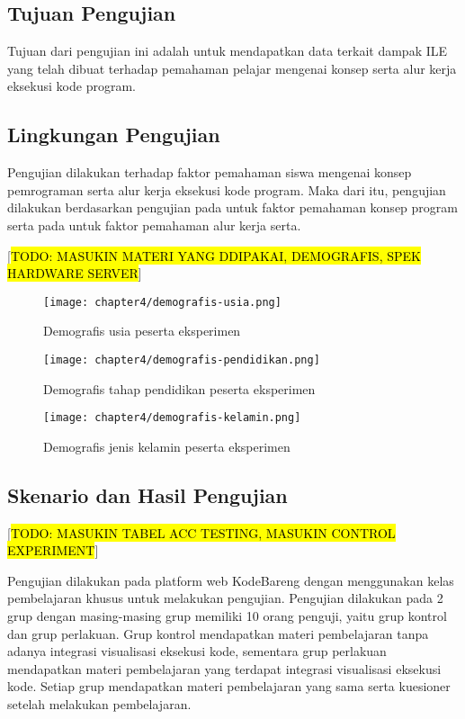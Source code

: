 \subsection{Tujuan Pengujian}
Tujuan dari pengujian ini adalah untuk mendapatkan data terkait dampak ILE yang telah dibuat terhadap pemahaman pelajar mengenai konsep serta alur kerja eksekusi kode program.

\subsection{Lingkungan Pengujian}
Pengujian  dilakukan terhadap faktor pemahaman siswa mengenai konsep pemrograman serta alur kerja eksekusi kode program. Maka dari itu, pengujian dilakukan berdasarkan pengujian pada \textcite{mayer1981psychology} untuk faktor pemahaman konsep program serta pada \textcite{moons2013pilot} untuk faktor pemahaman alur kerja serta.

  [\hl{TODO: MASUKIN MATERI YANG DDIPAKAI, DEMOGRAFIS, SPEK HARDWARE SERVER}]

\begin{figure}[H]
  \centering
  \texttt{[image: chapter4/demografis-usia.png]}
  \caption{Demografis usia peserta eksperimen} \label{fig:demografis-usia}
\end{figure}
\begin{figure}[H]
  \centering
  \texttt{[image: chapter4/demografis-pendidikan.png]}
  \caption{Demografis tahap pendidikan peserta eksperimen} \label{fig:demografis-pendidikan}
\end{figure}
\begin{figure}[H]
  \centering
  \texttt{[image: chapter4/demografis-kelamin.png]}
  \caption{Demografis jenis kelamin peserta eksperimen} \label{fig:demografis-kelamin}
\end{figure}

\subsection{Skenario dan Hasil Pengujian}
[\hl{TODO: MASUKIN TABEL ACC TESTING, MASUKIN CONTROL EXPERIMENT}]

Pengujian dilakukan pada platform web KodeBareng dengan menggunakan kelas pembelajaran khusus untuk melakukan pengujian. Pengujian dilakukan pada 2 grup dengan masing-masing grup memiliki 10 orang penguji, yaitu grup kontrol dan grup perlakuan. Grup kontrol mendapatkan materi pembelajaran tanpa adanya integrasi visualisasi eksekusi kode, sementara grup perlakuan mendapatkan materi pembelajaran yang terdapat integrasi visualisasi eksekusi kode. Setiap grup mendapatkan materi pembelajaran yang sama serta kuesioner setelah melakukan pembelajaran.

